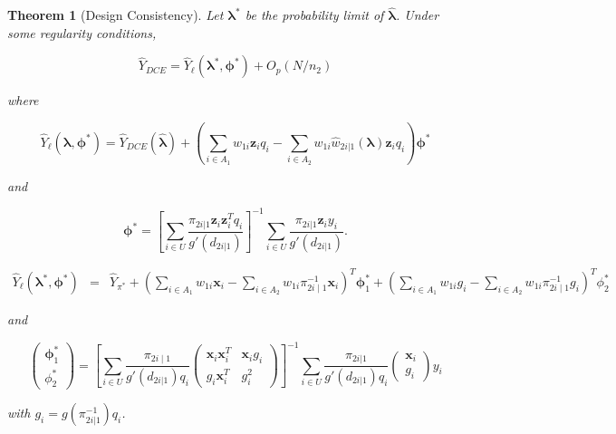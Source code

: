 \documentclass[12pt]{article}
\newtheorem{theorem}{Theorem}
\newcommand{\bx}{\mathbf{x}}
\renewcommand{\bf}[1]{\mathbf{#1}}
\begin{document}
\begin{theorem}[Design Consistency]\label{thm:dc1}
  Let $\bm \lambda^*$ be the probability limit of $\hat{\bm \lambda}$.
  Under some regularity conditions,

  $$\hat Y_{DCE} = \hat Y_\ell(\bm \lambda^*, \bm \phi^*) + O_p(N / n_2)$$

  where

  $$
  \hat Y_{\ell}(\bm \lambda, \bm \phi^*) = \hat Y_{DCE}(\hat{\bm \lambda}) + 
  \left(\sum_{i \in A_1} w_{1i} \bf z_i q_i - \sum_{i \in A_2} w_{1i} \hat w_{2i|1}(
  \bm \lambda) \bf z_i q_i\right)\bm \phi^*
  $$

  and

  $$
  \bm \phi^* = 
  \left[\sum_{i \in U} \frac{\pi_{2i|1}\bf z_i \bf z_i^T q_i}{g'(d_{2i|1})}\right]^{-1}
  \sum_{i \in U} \frac{\pi_{2i|1}\bf z_i y_i}{g'(d_{2i|1})}.
  $$

   \begin{eqnarray*}
   \hat Y_{\ell}(\bm \lambda^*, \bm \phi^*) &=&   \hat{Y}_{\pi^*} + 
  \left(\sum_{i \in A_1} w_{1i} \bf x_i  -  \sum_{i \in A_2} w_{1i} \pi_{2i \mid
  1}^{-1} \bf x_i  \right)^T \bm \phi_1^* + \left(\sum_{i \in A_1} w_{1i} g_i  -
  \sum_{i \in A_2} w_{1i} \pi_{2i \mid 1}^{-1}g_i  \right)^T \phi_2^*  
  \end{eqnarray*} 

  and  

  $$
  \begin{pmatrix}
  \bm \phi_1^* \\
  \phi_2^* 
  \end{pmatrix}
  = \left[ \sum_{i \in U} \frac{\pi_{2i \mid 1} }{ g'(d_{2i|1}) q_i} 
  \begin{pmatrix}
  \bx_i \bx_i^T &   \bx_i g_i   \\
  g_i  \bx_i^T   & g_i^2     
  \end{pmatrix} \right]^{-1}
  \sum_{i \in U} \frac{\pi_{2i|1}}{ g'(d_{2i | 1}) q_i} 
  \begin{pmatrix}
    \bx_i \\ g_i 
  \end{pmatrix}y_i 
  $$

with $g_i = g( \pi_{2i |1}^{-1}) q_i$.
\end{theorem}
\end{document}
